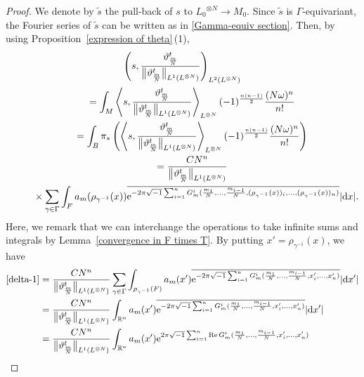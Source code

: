 \documentclass[pdftex]{sigma}
\numberwithin{equation}{section}
\newcommand{\R}{\mathbb{R}}
\renewcommand{\tilde}{\widetilde}
\newcommand{\abs}[1]{\lvert#1\rvert}
\def\re{\operatorname{Re}}
\begin{document}
\begin{proof}
We denote by ${\tilde s}$ the pull-back of $s$ to ${L_0}^{\otimes N}\to M_0$. Since ${\tilde s}$ is $\Gamma$-equivariant, the Fourier series of ${\tilde s}$ can be written as in \eqref{Gamma-equiv section}. Then, by using Proposition~\ref{expression of theta}\,(1),
\begin{gather}
\left( s, \frac{\vartheta^t_{\frac{m}{N}}}{\big\|\vartheta^t_{\frac{m}{N}}\big\|_{L^1(L^{\otimes N})}} \right)_{L^2(L^{\otimes N})}\nonumber \\
\qquad=\int_M\left\langle s, \frac{\vartheta^t_{\frac{m}{N}}}{\big\|\vartheta^t_{\frac{m}{N}}\big\|_{L^1(L^{\otimes N})}} \right\rangle_{L^{\otimes N}} (-1)^{\frac{n(n-1)}{2}}\dfrac{( N\omega)^n}{n!}\nonumber\\
\qquad=\int_B\pi_*\left(\left\langle s, \frac{\vartheta^t_{\frac{m}{N}}}{\big\|\vartheta^t_{\frac{m}{N}}\big\|_{L^1(L^{\otimes N})}} \right\rangle_{L^{\otimes N}} (-1)^{\frac{n(n-1)}{2}}\dfrac{( N\omega)^n}{n!}\right)\nonumber\\
\qquad= \frac{CN^n}{\big\|\vartheta^t_{\frac{m}{N}}\big\|_{L^1(L^{\otimes N})}}\nonumber\\
\phantom{\qquad=}{} \times \sum_{\gamma \in \Gamma}\int_F a_m(\rho_{\gamma^{-1}}(x))\overline{{\rm e}^{-2\pi\sqrt{-1}\sum_{i=1}^n G_m^i(\frac{m_1}{N},\ldots ,\frac{m_{i-1}}{N},(\rho_{\gamma^{-1}}(x))_i,\ldots ,(\rho_{\gamma^{-1}}(x))_n)}}\abs{{\rm d}x}.\label{delta-1}
\end{gather}
Here, we remark that we can interchange the operations to take infinite sums and integrals by Lemma~\ref{convergence in F times T}. By putting $x'=\rho_{\gamma^{-1}}(x)$, we have
\begin{align}
\eqref{delta-1}={}&\frac{CN^n}{\big\|\vartheta^t_{\frac{m}{N}}\big\|_{L^1(L^{\otimes N})}} \sum_{\gamma \in \Gamma}\int_{\rho_{\gamma^{-1}}(F)} a_m(x')\overline{{\rm e}^{-2\pi\sqrt{-1}\sum_{i=1}^n G_m^i(\frac{m_1}{N},\ldots ,\frac{m_{i-1}}{N},x'_i,\ldots ,x'_n)}}\abs{{\rm d}x'}\nonumber \\
={}&\frac{CN^n}{\big\|\vartheta^t_{\frac{m}{N}}\big\|_{L^1(L^{\otimes N})}}\int_{\R^n} a_m(x')\overline{{\rm e}^{-2\pi\sqrt{-1}\sum_{i=1}^n G_m^i(\frac{m_1}{N},\ldots ,\frac{m_{i-1}}{N},x'_i,\ldots ,x'_n)}}\abs{{\rm d}x'}\nonumber \\
={}&\frac{CN^n}{\big\|\vartheta^t_{\frac{m}{N}}\big\|_{L^1(L^{\otimes N})}}
\int_{\R^n} a_m(x'){\rm e}^{2\pi\sqrt{-1}\sum_{i=1}^n \re G_m^i(\frac{m_1}{N},\ldots ,\frac{m_{i-1}}{N},x'_i,\ldots ,x'_n)}\nonumber \\

\end{align}
\end{proof}
\end{document}
